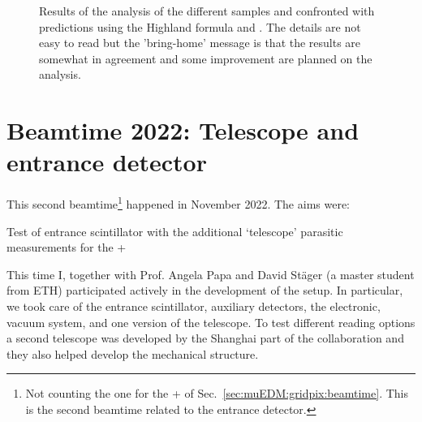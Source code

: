 \begin{refsection}
    \begin{figure}   
            \centering
            \hfill
            \caption{Results of the analysis of the different samples and confronted with predictions using the Highland formula and \gf. The details are not easy to read but the 'bring-home' message is that the results are somewhat in agreement and some improvement are planned on the analysis.}
            \label{fig:muEDM:bt2021:results}
        \end{figure}

\section{Beamtime 2022: Telescope and entrance detector}
    This second beamtime\footnote{Not counting the one for the \tpc + \grid of Sec.~\ref{sec:muEDM:gridpix:beamtime}. This is the second beamtime related to the entrance detector.} happened in November 2022.
    The aims were:
    \begin{outline}
        \1 Test of entrance scintillator with the additional `telescope'
        \1 parasitic measurements for the \tpc+ \grid
    \end{outline}
    This time I, together with Prof. Angela Papa and David St\"{a}ger (a master student from ETH) participated actively in the development of the setup. 
    In particular, we took care of the entrance scintillator, auxiliary detectors, the electronic, vacuum system, and one version of the telescope. 
    To test different reading options a second telescope was developed by the Shanghai part of the collaboration and they also helped develop the mechanical structure.


\end{refsection}
